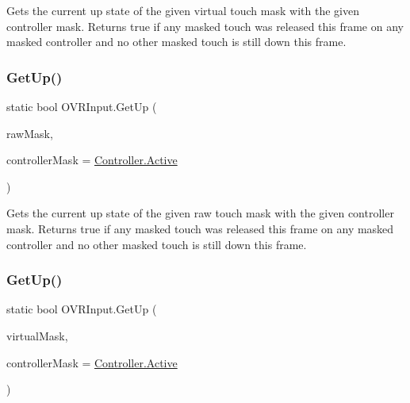 Gets the current up state of the given virtual touch mask with the given controller mask. Returns true if any masked touch was released this frame on any masked controller and no other masked touch is still down this frame. 

\mbox{\label{class_o_v_r_input_a32e849220eb1167615c8e44e7f7cfd41}} 
\subsubsection{\texorpdfstring{Get\+Up()}{GetUp()}\hspace{0.1cm}{\footnotesize\ttfamily [4/6]}}
{\footnotesize\ttfamily static bool O\+V\+R\+Input.\+Get\+Up (\begin{DoxyParamCaption}\item[{\mbox{\hyperlink{class_o_v_r_input_a6e130faa2035c5b20853c1177d909cc6}{Raw\+Touch}}}]{raw\+Mask,  }\item[{\mbox{\hyperlink{class_o_v_r_input_a5c86f9052a9cbb0b73779ff5704d60a8}{Controller}}}]{controller\+Mask = {\ttfamily \mbox{\hyperlink{class_o_v_r_input_a5c86f9052a9cbb0b73779ff5704d60a8a4d3d769b812b6faa6b76e1a8abaece2d}{Controller.\+Active}}} }\end{DoxyParamCaption})\hspace{0.3cm}{\ttfamily [static]}}



Gets the current up state of the given raw touch mask with the given controller mask. Returns true if any masked touch was released this frame on any masked controller and no other masked touch is still down this frame. 

\mbox{\label{class_o_v_r_input_a68539258d6e7216281b8f85722ac10b3}} 
\subsubsection{\texorpdfstring{Get\+Up()}{GetUp()}\hspace{0.1cm}{\footnotesize\ttfamily [5/6]}}
{\footnotesize\ttfamily static bool O\+V\+R\+Input.\+Get\+Up (\begin{DoxyParamCaption}\item[{\mbox{\hyperlink{class_o_v_r_input_afa31aa573064be9bab8fc9e58cddeab6}{Near\+Touch}}}]{virtual\+Mask,  }\item[{\mbox{\hyperlink{class_o_v_r_input_a5c86f9052a9cbb0b73779ff5704d60a8}{Controller}}}]{controller\+Mask = {\ttfamily \mbox{\hyperlink{class_o_v_r_input_a5c86f9052a9cbb0b73779ff5704d60a8a4d3d769b812b6faa6b76e1a8abaece2d}{Controller.\+Active}}} }\end{DoxyParamCaption})\hspace{0.3cm}{\ttfamily [static]}}



